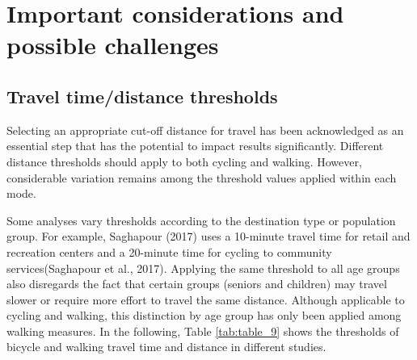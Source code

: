 \documentclass[
11pt, %
oneside, %
english, %
singlespacing, %
]{macthesis} %
\begin{document}
\hypertarget{important-considerations-and-possible-challenges}{%
\section{Important considerations and possible challenges}\label{important-considerations-and-possible-challenges}}

\hypertarget{travel-timedistance-thresholds}{%
\subsection{Travel time/distance thresholds}\label{travel-timedistance-thresholds}}

Selecting an appropriate cut-off distance for travel has been acknowledged as an essential step that has the potential to impact results significantly. Different distance thresholds should apply to both cycling and walking. However, considerable variation remains among the threshold values applied within each mode.

Some analyses vary thresholds according to the destination type or population group. For example, Saghapour (2017) uses a 10-minute travel time for retail and recreation centers and a 20-minute time for cycling to community services(Saghapour et al., 2017). Applying the same threshold to all age groups also disregards the fact that certain groups (seniors and children) may travel slower or require more effort to travel the same distance. Although applicable to cycling and walking, this distinction by age group has only been applied among walking measures. In the following, Table \ref{tab:table_9} shows the thresholds of bicycle and walking travel time and distance in different studies.
\end{document}
